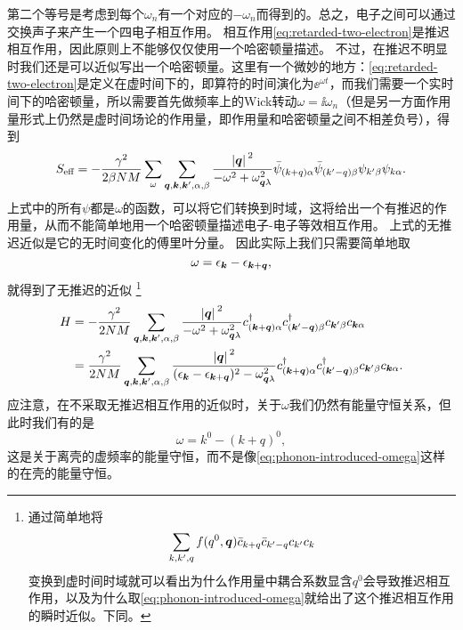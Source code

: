 第二个等号是考虑到每个$\omega_n$有一个对应的$-\omega_n$而得到的。总之，电子之间可以通过交换声子来产生一个四电子相互作用。
相互作用\eqref{eq:retarded-two-electron}是推迟相互作用，因此原则上不能够仅仅使用一个哈密顿量描述。
不过，在推迟不明显时我们还是可以近似写出一个哈密顿量。这里有一个微妙的地方：\eqref{eq:retarded-two-electron}是定义在虚时间下的，即算符的时间演化为$\ee^{\omega t}$，而我们需要一个实时间下的哈密顿量，所以需要首先做频率上的Wick转动$\omega = \ii \omega_n$（但是另一方面作用量形式上仍然是虚时间场论的作用量，即作用量和哈密顿量之间不相差负号），得到
\[
    S_\text{eff} = - \frac{\gamma^2}{2 \beta N M} \sum_{\omega} \sum_{\vb*{q}, \vb*{k}, \vb*{k}', \alpha, \beta} \frac{\abs*{\vb*{q}}^2}{- \omega^2 + \omega_{\vb*{q} \lambda}^2} \bar{\psi}_{({k}+{q}) \alpha} \bar{\psi}_{({k}' - {q}) \beta} \psi_{{k}' \beta} \psi_{{k} \alpha}.
\]
上式中的所有$\psi$都是$\omega$的函数，可以将它们转换到时域，这将给出一个有推迟的作用量，从而不能简单地用一个哈密顿量描述电子-电子等效相互作用。
上式的无推迟近似是它的无时间变化的傅里叶分量。
因此实际上我们只需要简单地取
\begin{equation}
    \omega = \epsilon_{\vb*{k}} - \epsilon_{\vb*{k} + \vb*{q}},
    \label{eq:phonon-introduced-omega}
\end{equation}
就得到了无推迟的近似%
\footnote{
    通过简单地将
    \[
        \sum_{k, k', q} f(q^0, \vb*{q}) \bar{c}_{k+q} \bar{c}_{k'-q} c_{k'} c_k
    \]
    变换到虚时间时域就可以看出为什么作用量中耦合系数显含$q^0$会导致推迟相互作用，以及为什么取\eqref{eq:phonon-introduced-omega}就给出了这个推迟相互作用的瞬时近似。下同。
}%
\begin{equation}
    \begin{aligned}
        {H} &= - \frac{\gamma^2}{2 N M} \sum_{\vb*{q}, \vb*{k}, \vb*{k}', \alpha, \beta} \frac{\abs*{\vb*{q}}^2}{- \omega^2 + \omega_{\vb*{q} \lambda}^2} {c}^\dagger_{(\vb*{k}+\vb*{q}) \alpha} {c}^\dagger_{(\vb*{k}' - \vb*{q}) \beta} {c}_{\vb*{k}' \beta} {c}_{\vb*{k} \alpha} \\
        &= \frac{\gamma^2}{2 N M} \sum_{\vb*{q}, \vb*{k}, \vb*{k}', \alpha, \beta} \frac{\abs*{\vb*{q}}^2}{(\epsilon_{\vb*{k}} - \epsilon_{\vb*{k}+\vb*{q}})^2 - \omega_{\vb*{q} \lambda}^2} {c}^\dagger_{(\vb*{k}+\vb*{q}) \alpha} {c}^\dagger_{(\vb*{k}' - \vb*{q}) \beta} {c}_{\vb*{k}' \beta} {c}_{\vb*{k} \alpha}.
    \end{aligned}
\end{equation}
应注意，在不采取无推迟相互作用的近似时，关于$\omega$我们仍然有能量守恒关系，但此时我们有的是
\[
    \omega = k^0 - (k + q)^0,
\]
这是关于离壳的虚频率的能量守恒，而不是像\eqref{eq:phonon-introduced-omega}这样的在壳的能量守恒。

